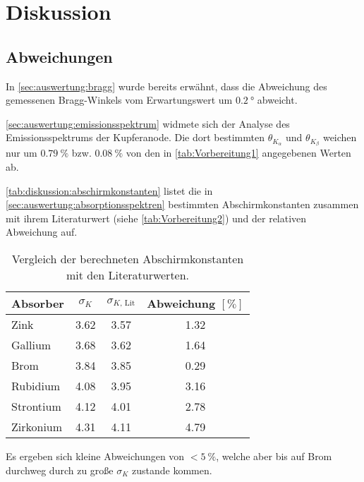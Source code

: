 \section{Diskussion}

\subsection{Abweichungen}

In \autoref{sec:auswertung:bragg} wurde bereits erwähnt,
dass die Abweichung des gemessenen Bragg-Winkels vom Erwartungswert
um $\SI{0.2}{\degree}$ abweicht.


\autoref{sec:auswertung:emissionsspektrum} widmete sich der Analyse des Emissionsspektrums der Kupferanode.
Die dort bestimmten $\theta_{K_\alpha}$ und $\theta_{K_\beta}$ weichen nur um
$\SI{0.79}{\percent}$ bzw. $\SI{0.08}{\percent}$ von den in \autoref{tab:Vorbereitung1} angegebenen Werten ab.


\autoref{tab:diskussion:abschirmkonstanten} listet die in \autoref{sec:auswertung:absorptionsspektren} bestimmten Abschirmkonstanten
zusammen mit ihrem Literaturwert (siehe \autoref{tab:Vorbereitung2}) und der relativen Abweichung auf.

\begin{table}
    \centering
    \caption{Vergleich der berechneten Abschirmkonstanten mit den Literaturwerten.}
    \label{tab:diskussion:abschirmkonstanten}
    \begin{tabular}{l S[table-format=1.2] S[table-format=1.2] S[table-format=1.2]}
    \toprule
    Absorber &
    {$\sigma_K$} &
    {$\sigma_{K\text{, Lit}}$} &
    {Abweichung $[\si{\percent}]$} \\
    \midrule
    Zink      & 3.62 & 3.57 & 1.32 \\
    Gallium   & 3.68 & 3.62 & 1.64 \\
    Brom      & 3.84 & 3.85 & 0.29 \\
    Rubidium  & 4.08 & 3.95 & 3.16 \\
    Strontium & 4.12 & 4.01 & 2.78 \\
    Zirkonium & 4.31 & 4.11 & 4.79 \\
    \bottomrule
    \end{tabular}
\end{table}

Es ergeben sich kleine Abweichungen von $< \SI{5}{\percent}$,
welche aber bis auf Brom durchweg durch zu große $\sigma_K$ zustande kommen.


